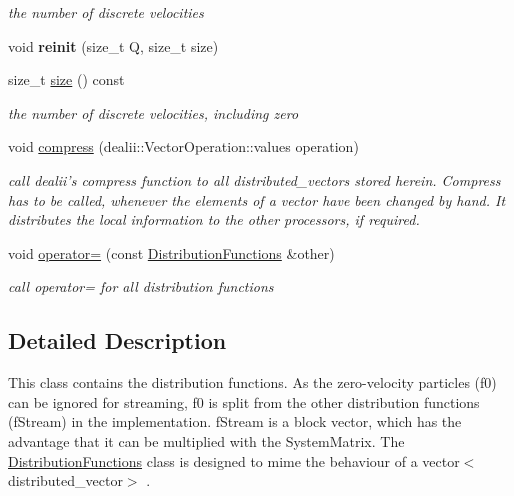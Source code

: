 \begin{DoxyCompactItemize}
\begin{DoxyCompactList}\small\item\em the number of discrete velocities \item\end{DoxyCompactList}\item 
\hypertarget{classnatrium_1_1DistributionFunctions_acaca68f7cbb9322d354ad6dca68b2cb2}{
void {\bfseries reinit} (size\_\-t Q, size\_\-t size)}
\label{classnatrium_1_1DistributionFunctions_acaca68f7cbb9322d354ad6dca68b2cb2}

\item 
\hypertarget{classnatrium_1_1DistributionFunctions_a636814c639143c76989b09b2a92b6757}{
size\_\-t \hyperlink{classnatrium_1_1DistributionFunctions_a636814c639143c76989b09b2a92b6757}{size} () const }
\label{classnatrium_1_1DistributionFunctions_a636814c639143c76989b09b2a92b6757}

\begin{DoxyCompactList}\small\item\em the number of discrete velocities, including zero \item\end{DoxyCompactList}\item 
void \hyperlink{classnatrium_1_1DistributionFunctions_a5b0afbafe841922dd3f949cc315b5533}{compress} (dealii::VectorOperation::values operation)
\begin{DoxyCompactList}\small\item\em call dealii's compress function to all distributed\_\-vectors stored herein. Compress has to be called, whenever the elements of a vector have been changed by hand. It distributes the local information to the other processors, if required. \item\end{DoxyCompactList}\item 
void \hyperlink{classnatrium_1_1DistributionFunctions_a5e61cb3ba258cf0958e1557061ed31b9}{operator=} (const \hyperlink{classnatrium_1_1DistributionFunctions}{DistributionFunctions} \&other)
\begin{DoxyCompactList}\small\item\em call operator= for all distribution functions \item\end{DoxyCompactList}\end{DoxyCompactItemize}


\subsection{Detailed Description}
This class contains the distribution functions. As the zero-\/velocity particles (f0) can be ignored for streaming, f0 is split from the other distribution functions (fStream) in the implementation. fStream is a block vector, which has the advantage that it can be multiplied with the SystemMatrix. The \hyperlink{classnatrium_1_1DistributionFunctions}{DistributionFunctions} class is designed to mime the behaviour of a vector$<$distributed\_\-vector$>$ . 

